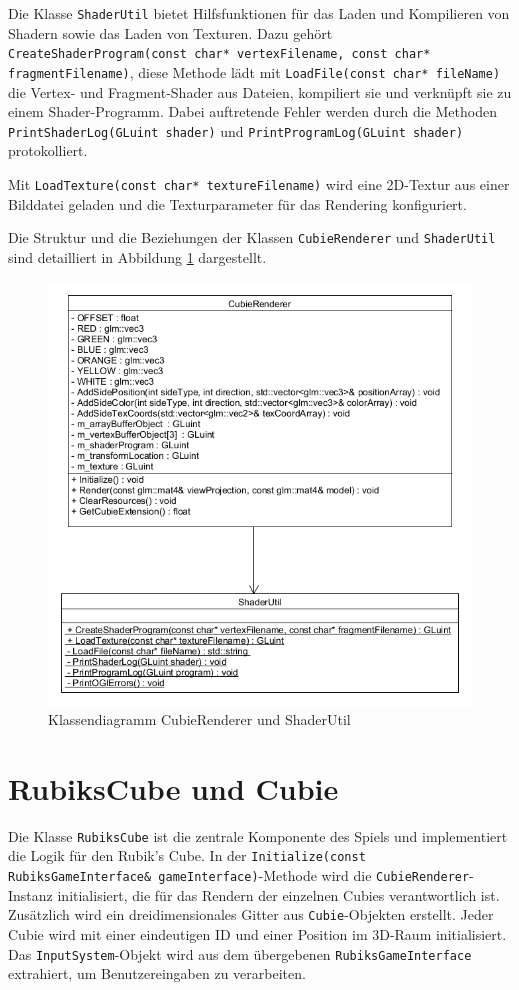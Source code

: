 Die Klasse \texttt{ShaderUtil} bietet Hilfsfunktionen für das Laden und Kompilieren von Shadern sowie das Laden von Texturen. Dazu gehört \texttt{CreateShaderProgram(const char* vertexFilename, const char* fragmentFilename)}, diese Methode lädt mit \texttt{LoadFile(const char* fileName)} die Vertex- und Fragment-Shader aus Dateien, kompiliert sie und verknüpft sie zu einem Shader-Programm. Dabei auftretende Fehler werden durch die Methoden \texttt{PrintShaderLog(GLuint shader)} und \texttt{PrintProgramLog(GLuint shader)} protokolliert. 

Mit \texttt{LoadTexture(const char* textureFilename)} wird eine 2D-Textur aus einer Bilddatei geladen und die Texturparameter für das Rendering konfiguriert.

Die Struktur und die Beziehungen der Klassen \texttt{CubieRenderer} und \texttt{ShaderUtil} sind detailliert in Abbildung \ref{CubieRendererDia} dargestellt.

\begin{figure} [H]
	\centering
	\includegraphics[scale=0.55]{images/CubieRendererClassDia.png}
	\caption{Klassendiagramm CubieRenderer und ShaderUtil}
	\label{CubieRendererDia}
\end{figure}

\section{RubiksCube und Cubie}
Die Klasse \texttt{RubiksCube} ist die zentrale Komponente des Spiels und implementiert die Logik für den Rubik's Cube. In der \texttt{Initialize(const RubiksGameInterface\& gameInterface)}-Methode wird die \texttt{CubieRenderer}-Instanz initialisiert, die für das Rendern der einzelnen Cubies verantwortlich ist. Zusätzlich wird ein dreidimensionales Gitter aus \texttt{Cubie}-Objekten erstellt. Jeder Cubie wird mit einer eindeutigen ID und einer Position im 3D-Raum initialisiert. Das \texttt{InputSystem}-Objekt wird aus dem übergebenen \texttt{RubiksGameInterface} extrahiert, um Benutzereingaben zu verarbeiten.


